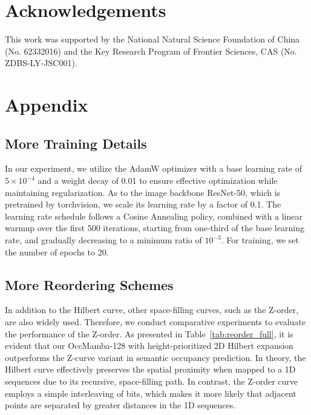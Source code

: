 \documentclass[10pt,twocolumn,letterpaper]{article}
\begin{document}
\section*{Acknowledgements}

This work was supported by the National Natural Science Foundation of China (No. 62332016) and the Key Research Program of Frontier Sciences, CAS (No. ZDBS-LY-JSC001).




\appendix

\section{Appendix}

\subsection{More Training Details}

In our experiment, we utilize the AdamW optimizer with a base learning rate of $5 \times 10^{-4}$ and a weight decay of 0.01 to ensure effective optimization while maintaining regularization. As to the image backbone ResNet-50, which is pretrained by torchvision, we scale its learning rate by a factor of 0.1. The learning rate schedule follows a Cosine Annealing policy, combined with a linear warmup over the first 500 iterations, starting from one-third of the base learning rate, and gradually decreasing to a minimum ratio of $10^{-3}$. For training, we set the number of epochs to 20.

\subsection{More Reordering Schemes}

In addition to the Hilbert curve, other space-filling curves, such as the Z-order, are also widely used. Therefore, we conduct comparative experiments to evaluate the performance of the Z-order. As presented in Table~\ref{tab:reorder_full}, it is evident that our OccMamba-128 with height-prioritized 2D Hilbert expansion outperforms the Z-curve variant in semantic occupancy prediction. In theory, the Hilbert curve effectively preserves the spatial proximity when mapped to a 1D sequences due to its recursive, space-filling path. In contrast, the Z-order curve employs a simple interleaving of bits, which makes it more likely that adjacent points are separated by greater distances in the 1D sequences.
\end{document}
